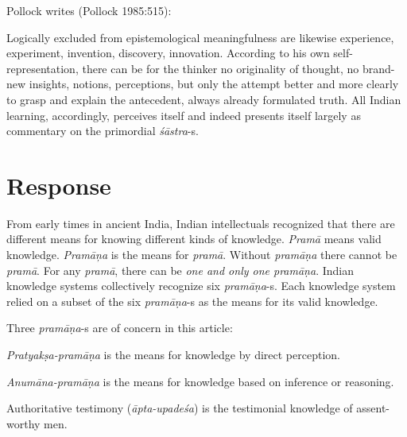 Pollock writes (Pollock 1985:515):
\begin{myquote}
Logically excluded from epistemological meaningfulness are likewise experience, experiment, invention, discovery, innovation.  According to his own self-representation, there can be for the thinker no originality of thought, no brand-new insights, notions, perceptions, but only the attempt better and more clearly to grasp and explain the antecedent, always already formulated truth. All Indian learning, accordingly, perceives itself and indeed presents itself largely as commentary on the primordial {\sl śāstra}-s.
\end{myquote}

\section*{Response}

From early times in ancient India, Indian intellectuals recognized that there are different means for knowing different kinds of knowledge. {\sl Pramā} means valid knowledge.  {\sl Pramāņa} is the means for {\sl pramā}.  Without {\sl pramāṇa} there cannot be {\sl pramā}.  For any {\sl pramā}, there can be {\sl one and only one pramāṇa}.  Indian knowledge systems collectively recognize six {\sl pramāṇa}-s. Each knowledge system relied on a subset of the six {\sl pramāṇa}-s as the means for its valid knowledge.

Three {\sl pramāṇa}-s are of concern in this article:
\begin{myquote}
{\sl Pratyakṣa-pramāṇa} is the means for knowledge by direct perception. 

{\sl Anumāna-pramāṇa} is the means for knowledge based on inference or reasoning.  

Authoritative testimony ({\sl āpta-upadeśa}) is the testimonial knowledge of assent-worthy men.
\end{myquote}


